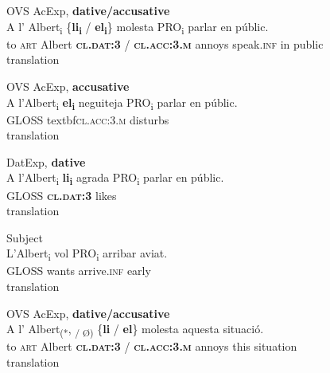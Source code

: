 \documentclass[output=paper,modfonts,nonflat,newtxmath]{langsci/langscibook}
\begin{document}
 
 
  \z
  \z


\ea%
 \label{ex:royo:12}
 \ea OVS AcExp, \textbf{dative/accusative} \label{ex:royo:12a}\\
 \gll  A l’ Albert\textsubscript{i} \{\textbf{li\textsubscript{i}} / \textbf{el\textsubscript{i}}\} molesta PRO\textsubscript{i} parlar en públic.\\
 to \textsc{art} Albert \textbf{\textsc{cl.dat:3}} / \textbf{\textsc{cl.acc:3.m}} annoys speak.\textsc{inf} in public\\
 \glt translation
 
 \ex OVS AcExp, \textbf{accusative}\label{ex:royo:12b}\\
 \gll A l’Albert\textsubscript{i} \textbf{el\textsubscript{i}} neguiteja PRO\textsubscript{i} parlar en públic.\\
 GLOSS textbf{\textsc{cl.acc:3.m}} disturbs\\
 \glt translation
 
 \ex DatExp, \textbf{dative}\label{ex:royo:12c}\\
 \gll A l’Albert\textsubscript{i} \textbf{li\textsubscript{i}} agrada PRO\textsubscript{i} parlar en públic.\\
 GLOSS  \textbf{\textsc{cl.dat:3}} likes\\
 \glt translation
 
 \ex Subject\label{ex:royo:12d}\\
 \gll L’Albert\textsubscript{i} vol PRO\textsubscript{i} arribar aviat.\\
GLOSS  wants arrive.\textsc{inf} early\\
 \glt translation
 
 \z
 \z


 
\ea%
 \label{ex:royo:13}
 \ea OVS AcExp, \textbf{dative/accusative}\label{ex:royo:13a}\\
 \gll A l’ Albert\textsubscript{(*}, \textsubscript{/ Ø)} \{\textbf{li} / \textbf{el}\} molesta aquesta situació.\\
 to \textsc{art} Albert \textbf{\textsc{cl.dat:3}} / \textbf{\textsc{cl.acc:3.m}} annoys this situation\\
 \glt translation
 
\end{document}
